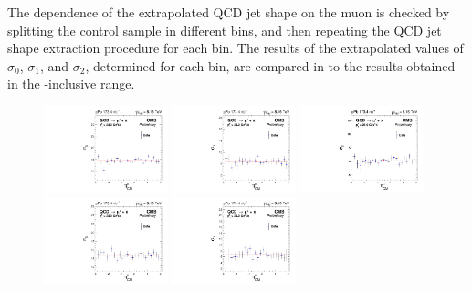 The dependence of the extrapolated QCD jet shape on the muon \etaMuCM is checked by splitting the control sample in different \etaMuCM bins, and then repeating the QCD jet shape extraction procedure for each \etaMuCM bin. The results of the extrapolated values of $\sigma_{0}$, $\sigma_{1}$, and $\sigma_{2}$, determined for each \etaMuCM bin, are compared in  to the results obtained in the \etaMuCM-inclusive range.

\begin{figure}[htb!]
 \centering
  \includegraphics[width=0.32\textwidth]{Figures/WBoson/Analysis/SignalExtraction/QCD_Template/EXTRAPOLATION_ETA/exGraph_ETA_Sigma0_QCDToMuMi_PA.pdf}
  \includegraphics[width=0.32\textwidth]{Figures/WBoson/Analysis/SignalExtraction/QCD_Template/EXTRAPOLATION_ETA/exGraph_ETA_Sigma1_QCDToMuMi_PA.pdf}
  \includegraphics[width=0.32\textwidth]{Figures/WBoson/Analysis/SignalExtraction/QCD_Template/EXTRAPOLATION_ETA/exGraph_ETA_Sigma2_QCDToMuMi_PA.pdf}
  \includegraphics[width=0.32\textwidth]{Figures/WBoson/Analysis/SignalExtraction/QCD_Template/EXTRAPOLATION_ETA/exGraph_ETA_Sigma0_QCDToMuPl_PA.pdf}
  \includegraphics[width=0.32\textwidth]{Figures/WBoson/Analysis/SignalExtraction/QCD_Template/EXTRAPOLATION_ETA/exGraph_ETA_Sigma1_QCDToMuPl_PA.pdf}

\end{figure}
